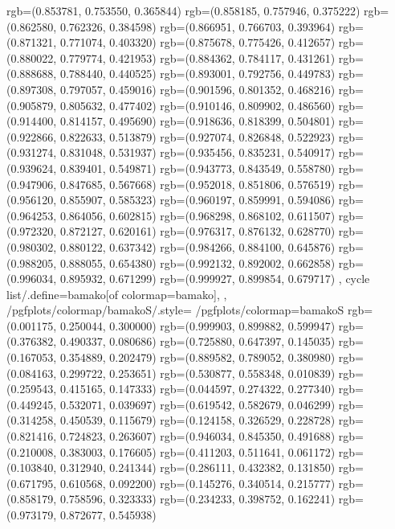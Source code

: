 {{{					rgb=(0.853781, 0.753550, 0.365844)
					rgb=(0.858185, 0.757946, 0.375222)
					rgb=(0.862580, 0.762326, 0.384598)
					rgb=(0.866951, 0.766703, 0.393964)
					rgb=(0.871321, 0.771074, 0.403320)
					rgb=(0.875678, 0.775426, 0.412657)
					rgb=(0.880022, 0.779774, 0.421953)
					rgb=(0.884362, 0.784117, 0.431261)
					rgb=(0.888688, 0.788440, 0.440525)
					rgb=(0.893001, 0.792756, 0.449783)
					rgb=(0.897308, 0.797057, 0.459016)
					rgb=(0.901596, 0.801352, 0.468216)
					rgb=(0.905879, 0.805632, 0.477402)
					rgb=(0.910146, 0.809902, 0.486560)
					rgb=(0.914400, 0.814157, 0.495690)
					rgb=(0.918636, 0.818399, 0.504801)
					rgb=(0.922866, 0.822633, 0.513879)
					rgb=(0.927074, 0.826848, 0.522923)
					rgb=(0.931274, 0.831048, 0.531937)
					rgb=(0.935456, 0.835231, 0.540917)
					rgb=(0.939624, 0.839401, 0.549871)
					rgb=(0.943773, 0.843549, 0.558780)
					rgb=(0.947906, 0.847685, 0.567668)
					rgb=(0.952018, 0.851806, 0.576519)
					rgb=(0.956120, 0.855907, 0.585323)
					rgb=(0.960197, 0.859991, 0.594086)
					rgb=(0.964253, 0.864056, 0.602815)
					rgb=(0.968298, 0.868102, 0.611507)
					rgb=(0.972320, 0.872127, 0.620161)
					rgb=(0.976317, 0.876132, 0.628770)
					rgb=(0.980302, 0.880122, 0.637342)
					rgb=(0.984266, 0.884100, 0.645876)
					rgb=(0.988205, 0.888055, 0.654380)
					rgb=(0.992132, 0.892002, 0.662858)
					rgb=(0.996034, 0.895932, 0.671299)
					rgb=(0.999927, 0.899854, 0.679717)
			},
		cycle list/.define={bamako}{[of colormap=bamako]},
		},
		/pgfplots/colormap/bamakoS/.style={
			/pgfplots/colormap={bamakoS}{%
					rgb=(0.001175, 0.250044, 0.300000)
					rgb=(0.999903, 0.899882, 0.599947)
					rgb=(0.376382, 0.490337, 0.080686)
					rgb=(0.725880, 0.647397, 0.145035)
					rgb=(0.167053, 0.354889, 0.202479)
					rgb=(0.889582, 0.789052, 0.380980)
					rgb=(0.084163, 0.299722, 0.253651)
					rgb=(0.530877, 0.558348, 0.010839)
					rgb=(0.259543, 0.415165, 0.147333)
					rgb=(0.044597, 0.274322, 0.277340)
					rgb=(0.449245, 0.532071, 0.039697)
					rgb=(0.619542, 0.582679, 0.046299)
					rgb=(0.314258, 0.450539, 0.115679)
					rgb=(0.124158, 0.326529, 0.228728)
					rgb=(0.821416, 0.724823, 0.263607)
					rgb=(0.946034, 0.845350, 0.491688)
					rgb=(0.210008, 0.383003, 0.176605)
					rgb=(0.411203, 0.511641, 0.061172)
					rgb=(0.103840, 0.312940, 0.241344)
					rgb=(0.286111, 0.432382, 0.131850)
					rgb=(0.671795, 0.610568, 0.092200)
					rgb=(0.145276, 0.340514, 0.215777)
					rgb=(0.858179, 0.758596, 0.323333)
					rgb=(0.234233, 0.398752, 0.162241)
					rgb=(0.973179, 0.872677, 0.545938)
}}}
